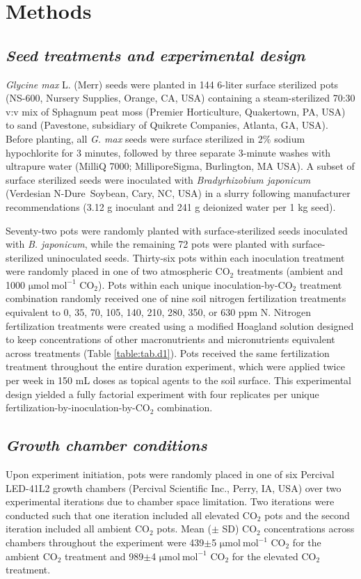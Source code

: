 \section{Methods}
\subsection{\textit{Seed treatments and experimental design}}
\noindent \textit{Glycine max} L. (Merr) seeds were planted in 144 6-liter surface sterilized pots (NS-600, Nursery Supplies, Orange, CA, USA) containing a steam-sterilized 70:30 v:v mix of Sphagnum peat moss (Premier Horticulture, Quakertown, PA, USA) to sand (Pavestone, subsidiary of Quikrete Companies, Atlanta, GA, USA). Before planting, all \textit{G. max} seeds were surface sterilized in 2\% sodium hypochlorite for 3 minutes, followed by three separate 3-minute washes with ultrapure water (MilliQ 7000; MilliporeSigma, Burlington, MA USA). A subset of surface sterilized seeds were inoculated with \textit{Bradyrhizobium japonicum} (Verdesian N-Dure\texttrademark\ Soybean, Cary, NC, USA) in a slurry following manufacturer recommendations (3.12 g inoculant and 241 g deionized water per 1 kg seed).
    
Seventy-two pots were randomly planted with surface-sterilized seeds inoculated with \textit{B. japonicum}, while the remaining 72 pots were planted with surface-sterilized uninoculated seeds. Thirty-six pots within each inoculation treatment were randomly placed in one of two atmospheric CO$_2$ treatments (ambient and 1000 $\mathrm{\mu mol\ mol^{-1}}$ CO$_2$). Pots within each unique inoculation-by-CO$_2$ treatment combination randomly received one of nine soil nitrogen fertilization treatments equivalent to 0, 35, 70, 105, 140, 210, 280, 350, or 630 ppm N. Nitrogen fertilization treatments were created using a modified Hoagland solution  designed to keep concentrations of other macronutrients and micronutrients equivalent across treatments (Table \ref{table:tab.d1}). Pots received the same fertilization treatment throughout the entire duration experiment, which were applied twice per week in 150 mL doses as topical agents to the soil surface. This experimental design yielded a fully factorial experiment with four replicates per unique fertilization-by-inoculation-by-CO$_2$ combination.

\subsection{\textit{Growth chamber conditions}}
\noindent Upon experiment initiation, pots were randomly placed in one of six Percival LED-41L2 growth chambers (Percival Scientific Inc., Perry, IA, USA) over two experimental iterations due to chamber space limitation. Two iterations were conducted such that one iteration included all elevated CO$_2$ pots and the second iteration included all ambient CO$_2$ pots. Mean ($\pm$ SD) CO$_2$ concentrations across chambers throughout the experiment were 439$\pm$5 $\mathrm{\mu mol\ mol^{-1}}$ CO$_2$ for the ambient CO$_2$ treatment and 989$\pm$4 $\mathrm{\mu mol\ mol^{-1}}$ CO$_2$ for the elevated CO$_2$ treatment.
    

